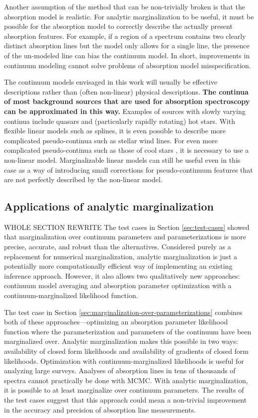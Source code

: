 \documentclass[trackchanges]{aastex62}
\begin{document}
Another assumption of the method that can be non-trivially broken is that the absorption model is realistic.
For analytic marginalization to be useful, it must be possible for the absorption model to correctly describe the actually present absorption features.
For example, if a region of a spectrum contains two clearly distinct absorption lines but the model only allows for a single line, the presence of the un-modeled line can bias the continuum model.
In short, improvements in continuum modeling cannot solve problems of absorption model misspecification.


The continuum models envisaged in this work will usually be effective descriptions rather than (often non-linear) physical descriptions.
{\color{red} \bf The continua of most background sources that are used for absorption spectroscopy can be approximated in this way.}
Examples of sources with slowly varying continua include quasars and (particularly rapidly rotating) hot stars.
With flexible linear models such as splines, it is even possible to describe more complicated pseudo-continua such as stellar wind lines.
For even more complicated pseudo-continua such as those of cool stars \citep[e.g.]{Zasowski:2015hi}, it is necessary to use a non-linear model.
Marginalizable linear models can still be useful even in this case as a way of introducing small corrections for pseudo-continuum features that are not perfectly described by the non-linear model.

\subsection{Applications of analytic marginalization}
WHOLE SECTION REWRITE
The test cases in Section \ref{sec:test-cases} showed that marginalization over continuum parameters and parameterizations is more precise, accurate, and robust than the alternatives.
Considered purely as a replacement for numerical marginalization, analytic marginalization is just a potentially more computationally efficient way of implementing an existing inference approach.
However, it also allows two qualitatively new approaches: continuum model averaging and absorption parameter optimization with a continuum-marginalized likelihood function.

The test case in Section \ref{sec:marginalization-over-parameterizations} combines both of these approaches---optimizing an absorption parameter likelihood function where the parameterization and parameters of the continuum have been marginalized over.
Analytic marginalization makes this possible in two ways: availability of closed form likelihoods and availability of gradients of closed form likelihoods.
Optimization with continuum-marginalized likelihoods is useful for analyzing large surveys.
Analyses of absorption lines in tens of thousands of spectra \citep[e.g.]{2013ApJ...770..130Z,Zasowski:2015hi} cannot practically be done with MCMC.
With analytic marginalization, it is possible to at least marginalize over continuum parameters.
The results of the test cases suggest that this approach could mean a non-trivial improvement in the accuracy and precision of absorption line measurements.
\end{document}
